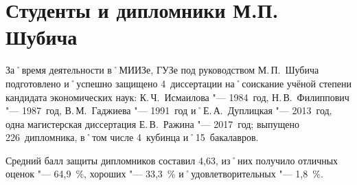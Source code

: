 ﻿\section{Студенты и дипломники М.П. Шубича}
За˚время деятельности в˚МИИЗе, ГУЗе под руководством М.\,П.~Шубича подготовлено и˚успешно защищено 4~диссертации на˚соискание учёной степени кандидата экономических наук: К.\,Ч.~Исмаилова "--- 1984~год, Н.\,В.~Филиппович "--- 1987~год, В.\,М.~Гаджиева "--- 1991~год и˚Е.\,А.~Дуплицкая "--- 2013~год, одна магистерская диссертация Е.\,В.~Ражина "--- 2017~год; выпущено 226~дипломника, в˚том числе 4~кубинца и˚15~бакалавров.

Средний балл защиты дипломников составил 4,63, из˚них получило отличных оценок "--- 64,9~\%, хороших "--- 33,3~\% и˚удовлетворительных "--- 1,8~\%.


